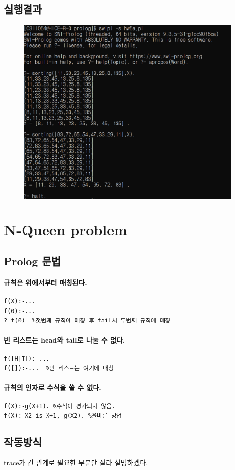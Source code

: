\documentclass{oblivoir}
\begin{document}
\subsection{실행결과}
\begin{figure}[h]
   
    \includegraphics[width=0.5\linewidth]{result_a.PNG}

\end{figure}

\section{N-Queen problem}
\subsection{Prolog 문법}
\paragraph*{규칙은 위에서부터 매칭된다.}
\begin{verbatim}
f(X):-...
f(0):-...
?-f(0). %첫번째 규칙에 매칭 후 fail시 두번째 규칙에 매칭
\end{verbatim}
\paragraph*{빈 리스트는 head와 tail로 나눌 수 없다.}
\begin{verbatim}
f([H|T]):-...
f([]):-...  %빈 리스트는 여기에 매칭
\end{verbatim}
\paragraph*{규칙의 인자로 수식을 쓸 수 없다.}
\begin{verbatim}
f(X):-g(X+1). %수식이 평가되지 않음.
f(X):-X2 is X+1, g(X2). %올바른 방법
\end{verbatim}

\subsection{작동방식}
trace가 긴 관계로 필요한 부분만 잘라 설명하겠다.
\end{document}
